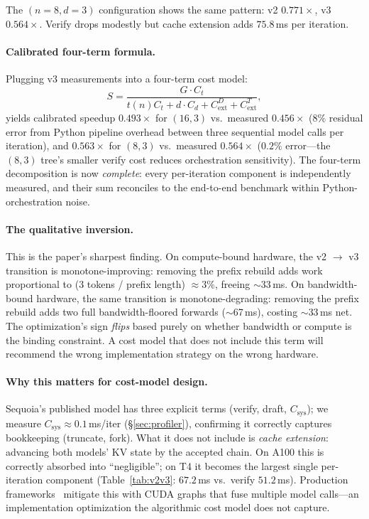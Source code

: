 \documentclass[letterpaper,twocolumn,10pt]{article}
\begin{document}
The $(n{=}8, d{=}3)$ configuration shows the same pattern: v2 $0.771\times$, v3 $0.564\times$.
Verify drops modestly but cache extension adds $75.8$\,ms per iteration.

\paragraph{Calibrated four-term formula.}
Plugging v3 measurements into a four-term cost model:
\[
S = \frac{G \cdot C_t}{t(n) C_t + d \cdot C_d + C_{\text{ext}}^D + C_{\text{ext}}^T},
\]
yields calibrated speedup $0.493\times$ for $(16,3)$ vs.\ measured $0.456\times$ ($8\%$ residual error from Python pipeline overhead between three sequential model calls per iteration), and $0.563\times$ for $(8,3)$ vs.\ measured $0.564\times$ ($0.2\%$ error---the $(8,3)$ tree's smaller verify cost reduces orchestration sensitivity).
The four-term decomposition is now \emph{complete}: every per-iteration component is independently measured, and their sum reconciles to the end-to-end benchmark within Python-orchestration noise.

\paragraph{The qualitative inversion.}
This is the paper's sharpest finding.
On compute-bound hardware, the v2 $\to$ v3 transition is monotone-improving: removing the prefix rebuild adds work proportional to (3 tokens / prefix length) $\approx 3\%$, freeing $\sim$33\,ms.
On bandwidth-bound hardware, the same transition is monotone-degrading: removing the prefix rebuild adds two full bandwidth-floored forwards ($\sim$67\,ms), costing $\sim$33\,ms net.
The optimization's sign \emph{flips} based purely on whether bandwidth or compute is the binding constraint.
A cost model that does not include this term will recommend the wrong implementation strategy on the wrong hardware.

\paragraph{Why this matters for cost-model design.}
Sequoia's published model has three explicit terms (verify, draft, $C_{\text{sys}}$); we measure $C_{\text{sys}} \approx 0.1$\,ms/iter (\S\ref{sec:profiler}), confirming it correctly captures bookkeeping (truncate, fork).
What it does not include is \emph{cache extension}: advancing both models' KV state by the accepted chain.
On A100 this is correctly absorbed into ``negligible''; on T4 it becomes the largest single per-iteration component (Table~\ref{tab:v2v3}: $67.2$\,ms vs.\ verify $51.2$\,ms).
Production frameworks~\cite{vllm_docs,trtllm_docs} mitigate this with CUDA graphs that fuse multiple model calls---an implementation optimization the algorithmic cost model does not capture.
\end{document}
